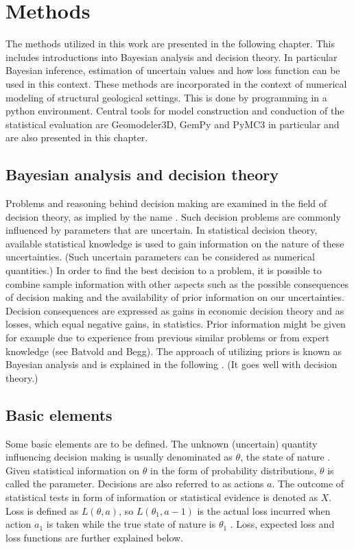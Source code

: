     \chapter{Methods}\label{cha:met}

    The methods utilized in this work are presented in the following chapter. This includes introductions into Bayesian analysis and decision theory. In particular Bayesian inference, estimation of uncertain values and how loss function can be used in this context. These methods are incorporated in the context of numerical modeling of structural geological settings. This is done by programming in a python environment. Central tools for model construction and conduction of the statistical evaluation are Geomodeler3D, GemPy and PyMC3 in particular and are also presented in this chapter.
    
        \section{Bayesian analysis and decision theory}
	    Problems and reasoning behind decision making are examined in the field of decision theory, as implied by the name \citep{berger2013stat}. Such decision problems are commonly influenced by parameters that are uncertain. In statistical decision theory, available statistical knowledge is used to gain information on the nature of these uncertainties. (Such uncertain parameters can be considered as numerical quantities.) In order to find the best decision to a problem, it is possible to combine sample information with other aspects such as the possible consequences of decision making and the availability of prior information on our uncertainties. Decision consequences are expressed as gains in economic decision theory and as losses, which equal negative gains, in statistics. Prior information might be given for example due to experience from previous similar problems or from expert knowledge (see Batvold and Begg). The approach of utilizing priors is known as Bayesian analysis and is explained in the following \citep{berger2013stat}. (It goes well with decision theory.)
	    
	    \section{Basic elements}
	    Some basic elements are to be defined. The unknown (uncertain) quantity influencing decision making is usually denominated as $\theta$, the state of nature \citep{berger2013stat}. Given statistical information on $\theta$ in the form of probability distributions, $\theta$ is called the parameter. 
	    Decisions are also referred to as actions $a$.
	    The outcome of statistical tests in form of information or statistical evidence is denoted as $X$.	    
	    Loss is defined as $L(\theta,a)$, so $L(\theta_1,a-1)$ is the actual loss incurred when action $a_1$ is taken while the true state of nature is $\theta_1$ \cite{pberger2013stat}. Loss, expected loss and loss functions are further explained below.  
        
